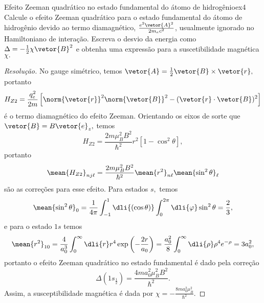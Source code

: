 \begin{exercício}{Efeito Zeeman quadrático no estado fundamental do átomo de hidrogênio}{ex4}
   Calcule o efeito Zeeman quadrático para o estado fundamental do átomo de hidrogênio devido ao termo diamagnético, \(\frac{e^2\vetor{A}^2}{2m_e c^2}\), usualmente ignorado no Hamiltoniano de interação. Escreva o desvio da energia como \(\Delta = -\frac12 \chi \vetor{B}^2\) e obtenha uma expressão para a suscetibilidade magnética \(\chi.\)
\end{exercício}
\begin{proof}[Resolução]
   No gauge simétrico, temos \(\vetor{A} = \frac12 \vetor{B} \times \vetor{r},\) portanto
   \begin{equation*}
      H_{Z2} = \frac{q_e^2}{2m}\left[\norm{\vetor{r}}^2 \norm{\vetor{B}}^2 - (\vetor{r}\cdot \vetor{B})^2\right]
   \end{equation*}
   é o termo diamagnético do efeito Zeeman. Orientando os eixos de sorte que \(\vetor{B} = B \vetor{e}_z,\) temos
   \begin{equation*}
      H_{Z2} = \frac{2m \mu_B^2B^2}{\hbar^2}r^2\left[1 - \cos^2\theta\right],
   \end{equation*}
   portanto
   \begin{equation*}
      \mean{H_{Z2}}_{nj\ell} = \frac{2m \mu_B^2 B^2}{\hbar^2} \mean{r^2}_{n\ell} \mean{\sin^2\theta}_{\ell}
   \end{equation*}
   são as correções para esse efeito. Para estados \(s,\) temos 
   \begin{equation*}
      \mean{\sin^2\theta}_0 = \frac1{4\pi}\int_{-1}^1 \dli{(\cos\theta)} \int_{0}^{2\pi} \dli{\varphi} \sin^2\theta = \frac23,
   \end{equation*}
   e para o estado \(1s\) temos
   \begin{equation*}
      \mean{r^2}_{10} = \frac{4}{a_0^3} \int_0^{\infty} \dli{r} r^4 \exp\left(-\frac{2r}{a_0}\right) = \frac{a_0^2}{8} \int_0^\infty \dli{\rho} \rho^4 e^{-\rho} = 3 a_0^2,
   \end{equation*}
   portanto o efeito Zeeman quadrático no estado fundamental é dado pela correção
   \begin{equation*}
      \Delta(1s_{\frac12}) = \frac{4m a_0^2\mu_B^2B^2}{\hbar^2}.
   \end{equation*}
   Assim, a susceptibilidade magnética é dada por \(\chi = - \frac{8m a_0^2 \mu_B^2}{\hbar^2}.\) 
\end{proof}
